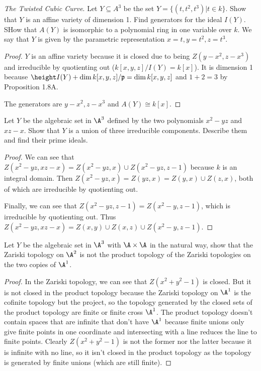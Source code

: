 \documentclass[openany, amssymb, psamsfonts]{amsart}
\begin{document}
\begin{exercise}%
\textit{The Twisted Cubic Curve}. Let $Y \subseteq A^3  $ be the set $Y = \{(t,t^2,t^3 )|t\in k\}   $. Show that $Y $ is an affine variety of dimension 1. Find generators for the ideal $I(Y) $. SHow that $A(Y) $ is isomorphic to a polynomial ring in one variable over $k $. We say that $Y $ is given by the parametric representation $x=t,y=t^2,z=t^3  $.
\end{exercise}
\begin{proof}
	$Y $ is an affine variety because it is closed due to being $Z(y-x^2,z-x^3) $ and irreducible by quotienting out ($k[x,y,z] / I(Y) = k[x] $).
	It is dimension 1 because $\height I(Y) + \dim k[x,y,z] / \mathfrak{p} = \dim k[x,y,z] $ and $1 + 2 = 3 $ by Proposition 1.8A.

	The generators are $y-x^2,z-x^3  $ and $A(Y) \cong k[x] $.
\end{proof}

\begin{exercise}%
Let $Y $ be the algebraic set in $\A^3 $ defined by the two polynomials $x^2-yz $ and $xz-x $. Show that $Y $ is a union of three irreducible components. Describe them and find their prime ideals.
\end{exercise}
\begin{proof}
	We can see that $Z(x^2-yz,xz-x) = Z(x^2-yz,x)\cup Z(x^2-yz,z-1)$ because $k $ is an integral domain.
	Then $Z(x^2-yz,x) = Z(yz,x) = Z(y,x)\cup Z(z,x)$, both of which are irreducible by quotienting out.

	Finally, we can see that $Z(x^2-yz,z-1) = Z(x^2-y,z-1) $, which is irreducible by quotienting out.
	Thus $Z(x^2-yz,xz-x) = Z(x,y)\cup Z(x,z)\cup Z(x^2-y,z-1) $.
\end{proof}

\begin{exercise}%
Let $Y $ be the algebraic set in $\A^3$ with $\A\times \A $ in the natural way, show that the Zariski topology on $\A^2$ is not the product topology of the Zariski topologies on the two copies of $\A^1 $.
\end{exercise}
\begin{proof}
	In the Zariski topology, we can see that $Z(x^2+y^2-1) $ is closed.
	But it is not closed in the product topology because the Zariski topology on $\A^1 $ is the cofinite topology but the project, so the topology generated by the closed sets of the product topology are finite or finite cross $\A^1 $.
	The product topology doesn't contain spaces that are infinite that don't have $\A^1 $ because finite unions only give finite points in one coordinate and intersecting with a line reduces the line to finite points.
	Clearly $Z(x^2+y^2-1) $ is not the former nor the latter because it is infinite with no line, so it isn't closed in the product topology as the topology is generated by finite unions (which are still finite).
\end{proof}
\end{document}
